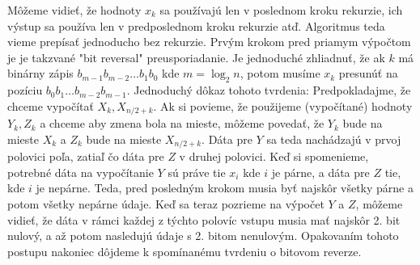 Môžeme vidieť, že hodnoty $x_k$ sa používajú len v poslednom kroku
rekurzie, ich výstup sa používa len v predposlednom kroku rekurzie
atď. Algoritmus teda vieme prepísať jednoducho bez rekurzie.
Prvým krokom pred priamym výpočtom je je takzvané "bit reversal"
preusporiadanie. Je jednoduché zhliadnuť, že ak $k$ má binárny zápis
$b_{m-1} b_{m-2} \dots b_1 b_0$ kde $m = \log_2 n$, potom musíme
$x_k$ presunúť na pozíciu $b_0 b_1 \dots b_{m-2} b_{m-1}$. Jednoduchý
dôkaz tohoto tvrdenia: 
Predpokladajme, že chceme vypočítať $X_k, X_{n/2+k}$. Ak si povieme,
že použijeme (vypočítané) hodnoty $Y_k, Z_k$ a chceme aby zmena bola
na mieste, môžeme povedať, že $Y_k$ bude na mieste $X_k$ a $Z_k$ bude
na mieste $X_{n/2+k}$. Dáta pre $Y$ sa teda nachádzajú v prvoj
polovici poľa, zatiaľ čo dáta pre $Z$ v druhej polovici.
Keď si spomenieme, potrebné dáta na vypočítanie $Y$ sú práve tie $x_i$ kde $i$ je párne,
a dáta pre $Z$ tie, kde $i$ je nepárne. Teda, pred posledným krokom
musia byť najskôr všetky párne a potom všetky nepárne údaje. Keď sa
teraz pozrieme na výpočet $Y$ a $Z$, môžeme vidieť, že dáta v rámci
každej z týchto polovíc vstupu musia mať najskôr 2. bit nulový, a až
potom nasledujú údaje s 2. bitom nenulovým. Opakovaním tohoto postupu
nakoniec dôjdeme k spomínanému tvrdeniu o bitovom reverze.



